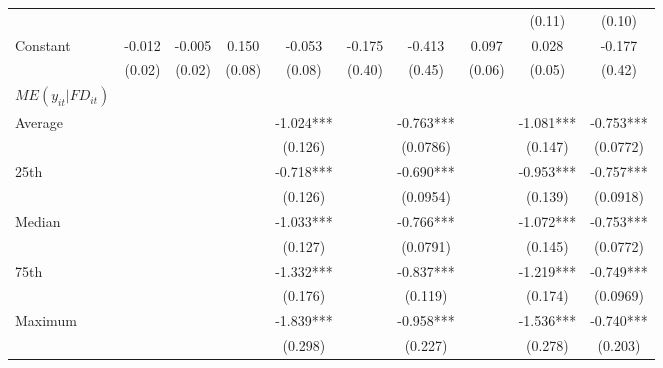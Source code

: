 \documentclass[12pt, a4paper]{article}
\begin{document}
\begin{table}[htbp]
\begin{threeparttable}
{\begin{tabular}{l*{9}{c}}
				&                     &                     &                     &                     &                     &                     &                     &      (0.11)         &      (0.10)         \\
				Constant            &      -0.012         &      -0.005         &       0.150         &      -0.053         &      -0.175         &      -0.413         &       0.097         &       0.028         &      -0.177         \\
				&      (0.02)         &      (0.02)         &      (0.08)         &      (0.08)         &      (0.40)         &      (0.45)         &      (0.06)         &      (0.05)         &      (0.42)         \\
				\hline
				$ME(y_{it}|FD_{it})$\\
				Average &&&&	-1.024***	&&	-0.763***&&		-1.081***	&	-0.753***\\
				&&&&	(0.126)   	&&	(0.0786)  && 		(0.147)   &		(0.0772)   \\
				
				25th&&&&	-0.718***	&&	-0.690***	&&	-0.953***	&	-0.757***\\
				&&&&	(0.126)   &&		(0.0954) &&  		(0.139)   	&	(0.0918) \\  
				
				Median&&&&	-1.033***	&&	-0.766***	&&	-1.072***	&	-0.753***\\
				&&&&(0.127) &&  		(0.0791)  && 		(0.145)   &		(0.0772)   \\
				
				75th&&&&	-1.332***	&&	-0.837***	&&	-1.219***	&	-0.749***\\
				&&&&(0.176)   &&		(0.119)   &&		(0.174)   	&	(0.0969)   \\
				
				Maximum	&&&&-1.839***	&&	-0.958***	&&	-1.536***	&	-0.740***\\
				&&&&(0.298)   &&		(0.227)   &&		(0.278)   &		(0.203)   \\
				

\end{tabular}}
\end{threeparttable}
\end{table}
\end{document}
